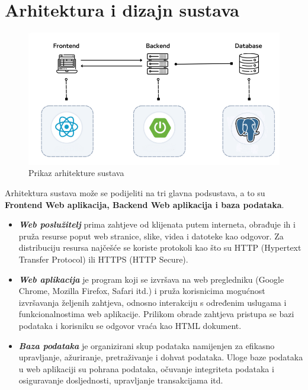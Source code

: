 \chapter{Arhitektura i dizajn sustava}

\begin{figure}[H]
	\includegraphics[scale=1]{slike/prikaz_arhitekture.png}
	\centering
	\caption{Prikaz arhitekture sustava}
\end{figure}

Arhitektura sustava može se podijeliti na tri glavna podsustava, a to su \textbf{Frontend Web aplikacija, Backend Web aplikacija i baza podataka}.
\begin{itemize}
	\item 	\textit{\textbf{Web poslužitelj}} prima zahtjeve od klijenata putem interneta, obrađuje ih i pruža resurse poput web stranice, slike, videa i datoteke kao odgovor. Za distribuciju resursa najčešće se koriste protokoli kao što su HTTP (Hypertext Transfer Protocol) ili HTTPS (HTTP Secure).
	\item 	\textit{\textbf{Web aplikacija}} je program koji se izvršava na web pregledniku (Google Chrome, Mozilla Firefox, Safari itd.) i pruža korisnicima mogućnost izvršavanja željenih zahtjeva, odnosno interakciju s određenim uslugama i funkcionalnostima web aplikacije. Prilikom obrade zahtjeva pristupa se bazi podataka i korisniku se odgovor vraća kao HTML dokument.
	\item 	\textit{\textbf{Baza podataka}} je organizirani skup podataka namijenjen za efikasno upravljanje, ažuriranje, pretraživanje i dohvat podataka. Uloge baze podataka u web aplikaciji su pohrana podataka, očuvanje integriteta podataka i osiguravanje dosljednosti, upravljanje transakcijama itd.
\end{itemize}

